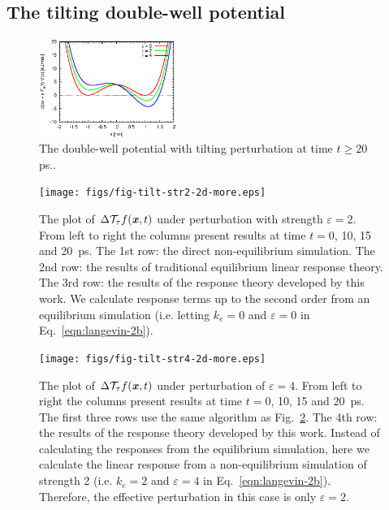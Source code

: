 \documentclass[aip,jcp,a4paper,reprint,onecolumn]{revtex4-1}
\newcommand{\vect}[1]{\textbf{\textit{#1}}}
\newcommand{\eps}{\varepsilon}
\newcommand{\mt}{\mathcal T}
\begin{document}
\subsection{The tilting double-well potential}

\begin{figure}
  \centering
  \includegraphics[width=0.4\textwidth]{figs/fig-tilt-pot.eps}
  \caption{The double-well potential with tilting perturbation at
    time $t\geq 20$ ps..}
  \label{fig:tmp1}
\end{figure}

\begin{figure}
  \centering
  \texttt{[image: figs/fig-tilt-str2-2d-more.eps]}
  \caption{The plot of $\Delta\mt_\tau f(\vect x,t)$ under
    perturbation with strength $\eps = 2$.  From left to right the
    columns present results at time $t = 0$, 10, 15 and
    20~\textsf{ps}.  The 1st row: the direct non-equilibrium
    simulation. The 2nd row: the results of traditional equilibrium
    linear response theory.  The 3rd row: the results of the response
    theory developed by this work.  We calculate response terms up to
    the second order from an equilibrium simulation (i.e. letting $k_e
    = 0$ and $\eps = 0$ in Eq.~\eqref{eqn:langevin-2b}).
  }
  \label{fig:tmp2}
\end{figure}

\begin{figure}
  \centering
  \texttt{[image: figs/fig-tilt-str4-2d-more.eps]}
  \caption{The plot of $\Delta\mt_\tau f(\vect x,t)$  under perturbation of
    $\eps = 4$. From left to right the
    columns present results at time $t = 0$, 10, 15 and
    20~\textsf{ps}.
    The first three rows use the same algorithm as Fig.~\ref{fig:tmp2}.    
    The 4th row: the results of the response theory developed by this work.
    Instead of calculating the responses from the equilibrium simulation,
    here we calculate the linear response from a non-equilibrium simulation
    of strength 2 (i.e. $k_e = 2$ and $\eps = 4$
    in Eq.~\eqref{eqn:langevin-2b}).
    Therefore, the effective perturbation in this case is only
    $\eps = 2$.
  }
  \label{fig:tmp3}
\end{figure}
\end{document}
